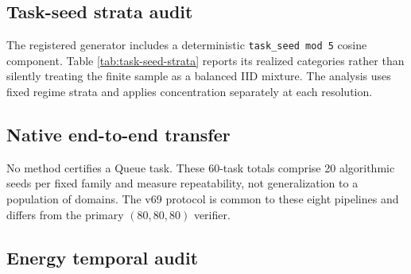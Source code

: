 \subsection{Task-seed strata audit}

The registered generator includes a deterministic
\texttt{task\_seed mod 5} cosine component.  Table
\ref{tab:task-seed-strata} reports its realized categories rather than
silently treating the finite sample as a balanced IID mixture.  The analysis
uses fixed regime strata and applies concentration separately at each
resolution.

\begin{table}[htbp]
\centering
\small
\caption{Realized latent-category counts among the 160 independent task
seeds.  The same seeds are crossed with all three grid resolutions.}
\label{tab:task-seed-strata}
\resizebox{0.92\textwidth}{!}{}
\end{table}

\subsection{Native end-to-end transfer}

\begin{table}[htbp]
\centering
\small
\caption{Native transfer pipelines at $N=13$ and $n_0=10$ with the same
384-call source archive and historical v69 terminal protocol.  Candidate
budgets are $(80,128,128)$, with an 8-call incumbent objective comparison.
Each method retains its own initialization and online adaptation.}
\label{tab:native-transfer}
\resizebox{0.88\textwidth}{!}{}
\end{table}

No method certifies a Queue task.  These 60-task totals comprise 20
algorithmic seeds per fixed family and measure repeatability, not
generalization to a population of domains.  The v69 protocol is common to
these eight pipelines and differs from the primary $(80,80,80)$ verifier.

\subsection{Energy temporal audit}

\begin{table}[htbp]
\centering
\small
\caption{Postdecision Energy temporal stability.  Counts are descriptive and
do not replace the declared empirical-window certificate.}
\label{tab:temporal-audit}
\resizebox{\textwidth}{!}{}
\end{table}

